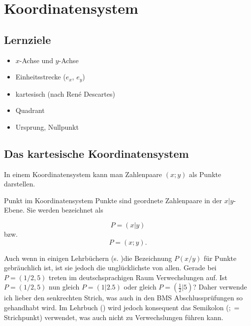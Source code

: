 
\section{Koordinatensystem}
\subsection*{Lernziele}

\begin{itemize}
\item $x$-Achse und $y$-Achse
\item Einheitsstrecke ($e_x$, $e_y$)
\item kartesisch (nach René Descartes)
\item Quadrant 
\item Ursprung, Nullpunkt
\end{itemize}

\newpage

\subsection{Das kartesische Koordinatensystem}
In einem Koordinatensystem kann man Zahlenpaare $(x; y)$ als Punkte
darstellen.

\begin{definition}{Punkt im Koordinatensystem}{}
  Punkte sind geordnete Zahlenpaare in der $x|y$-Ebene. Sie werden
  bezeichnet als

  $$P=(x|y)$$
  bzw.
  $$P=(x;y).$$

\end{definition}


\begin{bemerkung}{}{}
  Auch wenn in einigen Lehrbüchern  (s. \cite{frommenwiler17alg})die Bezeichnung $P(x/y)$ für Punkte gebräuchlich ist, ist
  sie jedoch die unglücklichste von allen. Gerade bei $P=(1/2,5)$
  treten im deutschsprachigen Raum Verwechslungen auf. Ist $P=(1/2,5)$
  nun gleich $P=(1 | 2.5)$ oder gleich $P=(\frac{1}{2} | 5)$?
  Daher verwende ich lieber den senkrechten Strich, was auch in den
  BMS Abschlussprüfungen so gehandhabt wird. Im Lehrbuch (\cite{marthaler21alg}) wird jedoch
  konsequent das Semikolon ($;$ = Strichpunkt) verwendet, was auch
  nicht zu Verwechslungen führen kann.
\end{bemerkung}
\newpage

